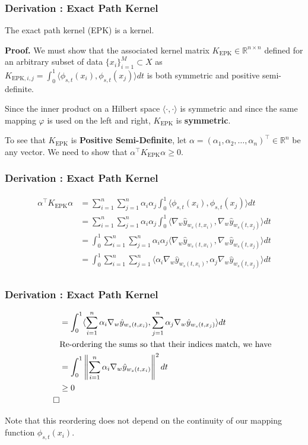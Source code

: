 \begin{frame}
  \frametitle{Derivation : Exact Path Kernel}
  \begin{lemma}%
  The exact path kernel (EPK) is a kernel.
  \end{lemma}


\textbf{Proof.} We must show that the associated kernel matrix $K_{\text{EPK}} \in \mathbb{R}^{n\times n}$ defined for an arbitrary subset of data $\{x_i\}_{i=1}^M \subset X$ as $K_{\text{EPK},i,j} = \int_0^1\langle \phi_{s,t}(x_i), \phi_{s,t}(x_j)\rangle dt$ is both symmetric and positive semi-definite.

Since the inner product on a Hilbert space $\langle \cdot, \cdot \rangle$ is symmetric and since the same mapping $\varphi$ is used on the left and right, $K_{\text{EPK}}$ is \textbf{symmetric}. 

To see that $K_{\text{EPK}}$ is \textbf{Positive Semi-Definite}, let
$\alpha = (\alpha_1, \alpha_2, \dots, \alpha_n)^\top \in \mathbb{R}^n$
be any vector. We need to show that $\alpha^\top K_{\text{EPK}} \alpha
\geq 0$.

\end{frame}
\begin{frame}
  \frametitle{Derivation : Exact Path Kernel}

\begin{align}
\alpha^\top K_{\text{EPK}} \alpha &= \sum_{i=1}^n \sum_{j=1}^n \alpha_i \alpha_j \int_0^1 \langle \phi_{s,t}(x_i), \phi_{s,t}(x_j)\rangle dt \\
&= \sum_{i=1}^n \sum_{j=1}^n \alpha_i \alpha_j \int_0^1 \langle
                                                                                                                                                  \nabla_{w}\hat{y}_{w_s(t,x_i)}, \nabla_{w}\hat{y}_{w_s(t,x_j)}\rangle dt \\
&= \int_0^1 \sum_{i=1}^n \sum_{j=1}^n \alpha_i \alpha_j \langle \nabla_{w}\hat{y}_{w_s(t,x_i)}, \nabla_{w}\hat{y}_{w_s(t,x_j)}\rangle dt \\
&= \int_0^1 \sum_{i=1}^n \sum_{j=1}^n  \langle \alpha_i \nabla_{w}\hat{y}_{w_s(t,x_i)}, \alpha_j \nabla_{w}\hat{y}_{w_s(t,x_j)}\rangle dt \\
\end{align}
\end{frame}

\begin{frame}
  \frametitle{Derivation : Exact Path Kernel}
  \begin{align}
&= \int_0^1    \langle \sum_{i=1}^n \alpha_i \nabla_{w}\hat{y}_{w_s(t,x_i)}, \sum_{j=1}^n \alpha_j \nabla_{w}\hat{y}_{w_s(t,x_j)}\rangle dt \\
& \text{Re-ordering the sums so that their indices match, we have}\\
&= \int_0^1 \left\lVert \sum_{i=1}^n \alpha_i \nabla_{w}\hat{y}_{w_s(t,x_i)}\right\rVert^2 dt \\
    &\geq 0 \\
    \qed
\end{align}

 Note that this reordering does not depend on the continuity of our mapping function $\phi_{s,t}(x_i)$.
\end{frame}

